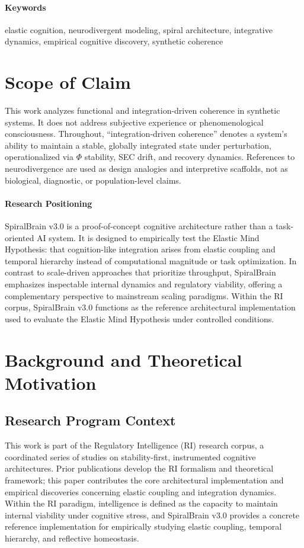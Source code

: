 \documentclass[11pt,a4paper]{article}
\begin{document}
\paragraph{Keywords}
elastic cognition, neurodivergent modeling, spiral architecture, integrative dynamics, empirical cognitive discovery, synthetic coherence

\section*{Scope of Claim}

This work analyzes functional and integration-driven coherence in synthetic systems. It does not address subjective experience or phenomenological consciousness. Throughout, ``integration-driven coherence'' denotes a system's ability to maintain a stable, globally integrated state under perturbation, operationalized via \( \Phi \) stability, SEC drift, and recovery dynamics. References to neurodivergence are used as design analogies and interpretive scaffolds, not as biological, diagnostic, or population-level claims.

\paragraph{Research Positioning}
SpiralBrain v3.0 is a proof-of-concept cognitive architecture rather than a task-oriented AI system. It is designed to empirically test the Elastic Mind Hypothesis: that cognition-like integration arises from elastic coupling and temporal hierarchy instead of computational magnitude or task optimization. In contrast to scale-driven approaches that prioritize throughput, SpiralBrain emphasizes inspectable internal dynamics and regulatory viability, offering a complementary perspective to mainstream scaling paradigms. Within the RI corpus, SpiralBrain v3.0 functions as the reference architectural implementation used to evaluate the Elastic Mind Hypothesis under controlled conditions.

\section{Background and Theoretical Motivation}
\label{sec:background}

\subsection{Research Program Context}

This work is part of the Regulatory Intelligence (RI) research corpus, a coordinated series of studies on stability-first, instrumented cognitive architectures. Prior publications develop the RI formalism and theoretical framework; this paper contributes the core architectural implementation and empirical discoveries concerning elastic coupling and integration dynamics. Within the RI paradigm, intelligence is defined as the capacity to maintain internal viability under cognitive stress, and SpiralBrain v3.0 provides a concrete reference implementation for empirically studying elastic coupling, temporal hierarchy, and reflective homeostasis.
\end{document}
